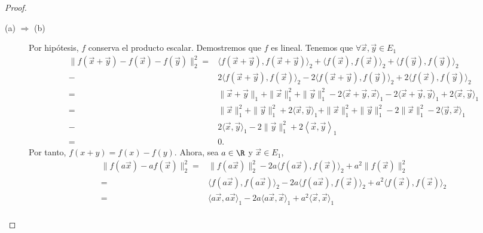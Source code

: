 \begin{proof}
\begin{description}
\item[(a) $\displaystyle \Rightarrow $ (b)] Por hipótesis, $\displaystyle f $ conserva el producto escalar. Demostremos que $\displaystyle f $ es lineal. Tenemos que $\displaystyle \forall \vec{x}, \vec{y} \in E_{1} $
\[
\begin{split}
	\|f\left(\vec{x} + \vec{y}\right) - f\left(\vec{x}\right) - f\left(\vec{y}\right) \|^{2}_{2} = & \langle f\left(\vec{x} + \vec{y}\right) , f\left(\vec{x} +\vec{y}\right)\rangle_{2} + \langle f\left(\vec{x}\right), f\left(\vec{x}\right)\rangle_{2} + \langle f\left(\vec{y}\right), f\left(\vec{y}\right)\rangle _{2}\\
	- & 2\langle f\left(\vec{x}+\vec{y}\right),f\left(\vec{x}\right)\rangle_{2}-2\langle f\left(\vec{x}+\vec{y}\right), f\left(\vec{y}\right)\rangle_{2}+2\langle f\left(\vec{x}\right), f\left(\vec{y}\right)\rangle_{2} \\
	= & \|\vec{x}+\vec{y}\|_{1} + \|\vec{x}\|_{1}^{2} + \|\vec{y}\|^{2}_{1}-2\langle \vec{x}+\vec{y}, \vec{x}\rangle_{1}-2\langle \vec{x}+\vec{y}, \vec{y}\rangle_{1}+2\langle \vec{x}, \vec{y}\rangle_{1} \\
	= & \|\vec{x}\|^{2}_{1} + \|\vec{y}\|^{2}_{1} + 2\langle\vec{x}, \vec{y}\rangle_{1} + \|\vec{x}\|^{2}_{1}+\|\vec{y}\|^{2}_{1}-2\|\vec{x}\|^{2}_{1}-2\langle\vec{y}, \vec{x}\rangle_{1}\\
	- & 2\langle\vec{x}, \vec{y}\rangle_{1}-2\|\vec{y}\|^{2}_{1} + 2\left\langle \vec{x}, \vec{y} \right\rangle _{1}\\
	= & 0.
\end{split}
\]
Por tanto, $\displaystyle f\left(x+y\right) = f\left(x\right)-f\left(y\right) $. Ahora, sea $\displaystyle a \in \R $ y $\displaystyle \vec{x} \in E_{1} $,
	\[
	\begin{split}
		\|f\left(a\vec{x}\right)-a f\left(\vec{x}\right) \|^{2}_{2} = & \|f\left(a\vec{x}\right)\|^{2}_{2} - 2a\langle f\left(a\vec{x}\right), f\left(\vec{x}\right) \rangle_{2}+a^{2}\|f\left(\vec{x}\right)\|^{2}_{2}\\
		= & \langle f\left(a\vec{x}\right), f\left(a\vec{x}\right)\rangle_{2}-2a\langle f\left(a\vec{x}\right), f\left(\vec{x}\right)\rangle_{2} + a^{2}\langle f\left(\vec{x}\right), f\left(\vec{x}\right)\rangle_{2} \\
		= & \langle a\vec{x}, a\vec{x} \rangle _{1} - 2a\langle a \vec{x}, \vec{x} \rangle _{1} + a^{2}\langle \vec{x}, \vec{x}\rangle _{1} \\

\end{split}\]
\end{description}
\end{proof}
